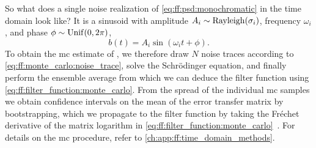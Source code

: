 So what does a single noise realization of \cref{eq:ff:psd:monochromatic} in the time domain look like?
It is a sinusoid with amplitude $A_i \sim\operatorname{Rayleigh}(\sigma_i)$,
frequency $\omega_i$, and phase $\phi \sim \operatorname{Unif}(0, 2\pi)$,
\begin{equation}\label{eq:ff:monte_carlo:noise_trace}
    b(t) = A_i\sin(\omega_i t + \phi).
\end{equation}
To obtain the \gls{mc} estimate of \liouvUetavg, we therefore draw $N$ noise traces according to \cref{eq:ff:monte_carlo:noise_trace}, solve the Schrödinger equation, and finally perform the ensemble average from which we can deduce the filter function using \cref{eq:ff:filter_function:monte_carlo}.
From the spread of the individual \gls{mc} samples we obtain confidence intervals on the mean of the error transfer matrix by bootstrapping, which we propagate to the filter function by taking the Fréchet derivative of the matrix logarithm in \cref{eq:ff:filter_function:monte_carlo}~\cite{Al-Mohy2013}.
For details on the \gls{mc} procedure, refer to \cref{ch:app:ff:time_domain_methods}.

